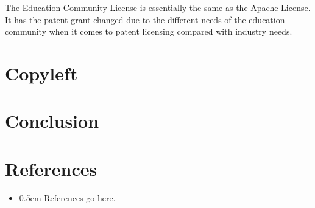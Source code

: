 \documentclass[12pt,letterpaper]{article}
\begin{document}
The Education Community License is essentially the same as the Apache License. It has the patent grant changed due to the different needs of the education community when it comes to patent licensing compared with industry needs.

\section{Copyleft}

\section{Conclusion}

\newpage
\section*{References}

\begin{itemize}[label={},itemindent=-15pt]

\item \openup 0.5em References go here.

\end{itemize}
\end{document}
